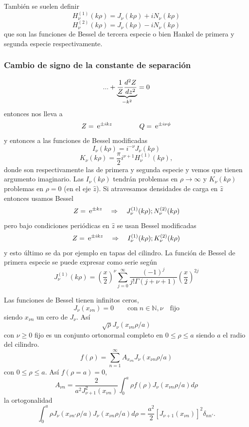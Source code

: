 \documentclass[10pt,oneside]{CBFT_book}
\begin{document}
También se suelen definir
\[
	H^{(1)}_\nu(k\rho) = J_\nu(k\rho) + i N_\nu(k\rho)
\]
\[
	H^{(2)}_\nu(k\rho) = J_\nu(k\rho) - i N_\nu(k\rho)
\]
que son las funciones de Bessel de tercera especie o bien Hankel de primera y segunda especie respectivamente.

\subsubsection{Cambio de signo de la constante de separación}

\[
	... + \underbrace{\frac{1}{Z} \dtot[2]{Z}{z}}_{-k^2} =  0
\]
entonces nos lleva a
\[
	Z = \euler^{\pm i k z} \qquad \qquad Q = \euler^{\pm i \nu \phi}
\]
y entonces a las funciones de Bessel modificadas
\[
	I_\nu(k\rho) = i^{-\nu} J_\nu(k\rho)
\]
\[
	K_\nu(k\rho) = \frac{\pi}{2}i^{\nu+1} H_\nu^{(1)}(k\rho),
\]
donde son respectivamente las de primera y segunda especie y vemos que tienen argumento imaginario.
Las $I_\nu(k\rho)$ tendrán problemas en $\rho\to\infty$ y $K_\nu(k\rho)$ problemas en $\rho=0$ (en el eje 
$\hat{z}$).
Si atravesamos densidades de carga en $\hat{z}$ entonces usamos Bessel
\[
	Z = \euler^{\pm k z} \quad \Rightarrow \quad J_\nu^{(1)}(k\rho) ; N_\nu^{(2)}(k\rho)
\]
pero bajo condiciones periódicas en $\hat{z}$ se usan Bessel modificadas
\[
	Z = \euler^{ \pm i k z} \quad \Rightarrow \quad I_\nu^{(1)}(k\rho) ; K_\nu^{(2)}(k\rho)
\]
y esto último se da por ejemplo en tapas del cilindro.
La función de Bessel de primera especie se puede expresar como serie según
\[
	J_\nu^{(1)}(k\rho) = \left(\frac{x}{2}\right)^\nu \sum_{j=0}^\infty \frac{(-1)^j}{j!\Gamma(j+\nu +1)} 
		\left(\frac{x}{2}\right)^{2j}
\]

Las funciones de Bessel tienen infinitos ceros,
\[
	J_\nu(x_{\nu n}) = 0 \qquad \mathrm{con} \; n\in\mathbb{N}, \nu \quad \mathrm{fijo} 
\]
siendo $x_{\nu n}$ un cero de $J_\nu$. Así
\[
	\sqrt{\rho} J_\nu(x_{\nu n} \rho/a) 
\]
con $\nu \geq 0$ fijo es un conjunto ortonormal completo en $0 \leq \rho \leq a$ siendo $a$ el radio del 
cilindro.
\[
	f(\rho) = \sum_{n=1}^{\infty}  A_{x_{\nu n}} J_{\nu}( x_{\nu n} \rho/a )
\]
con $0 \leq \rho \leq a$. Así $f(\rho=a)=0$,
\[
	A_{\nu n} = \frac{2}{a^2 J_{\nu +1}^2 (x_{\nu n})} \int_0^a \rho f(\rho) J_\nu (x_{\nu n} \rho/a) 
	d\rho
\]
la ortogonalidad
\[
	\int_0^a \rho  J_\nu (x_{\nu n'} \rho/a)  J_\nu (x_{\nu n} \rho/a)  d\rho = 
	\frac{a^2}{2}[J_{\nu+1}(x_{\nu n})]^2 \delta_{nn'}.
\]
\end{document}

